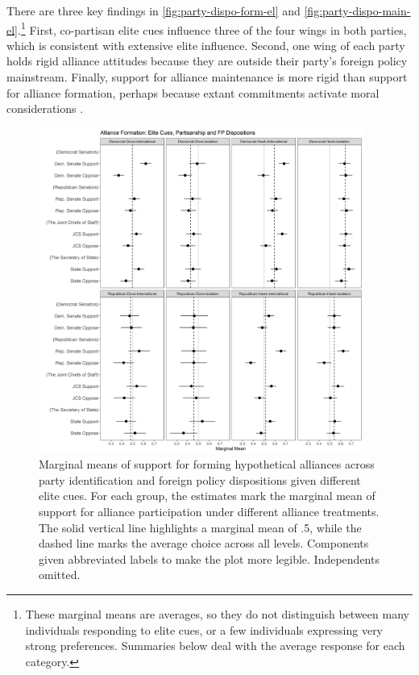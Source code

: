 \documentclass[12pt]{article}
\begin{document}
There are three key findings in \autoref{fig:party-dispo-form-el} and \autoref{fig:party-dispo-main-el}.\footnote{These marginal means are averages, so they do not distinguish between many individuals responding to elite cues, or a few individuals expressing very strong preferences. Summaries below deal with the average response for each category.} 
First, co-partisan elite cues influence three of the four wings in both parties, which is consistent with extensive elite influence. 
Second, one wing of each party holds rigid alliance attitudes because they are outside their party's foreign policy mainstream.  
Finally, support for alliance maintenance is more rigid than support for alliance formation, perhaps because extant commitments activate moral considerations \citep{TomzWeeks2021}. 


\begin{figure}[htpb]
	\centering
		\includegraphics[width=0.95\textwidth]{../figures/party-dispo-form-el.png}
	\caption{Marginal means of support for forming hypothetical alliances across party identification and foreign policy dispositions given different elite cues. For each group, the estimates mark the marginal mean of support for alliance participation under different alliance treatments. The solid vertical line highlights a marginal mean of .5, while the dashed line marks the average choice across all levels. Components given abbreviated labels to make the plot more legible. Independents omitted.}
	\label{fig:party-dispo-form-el}
\end{figure}
\end{document}
